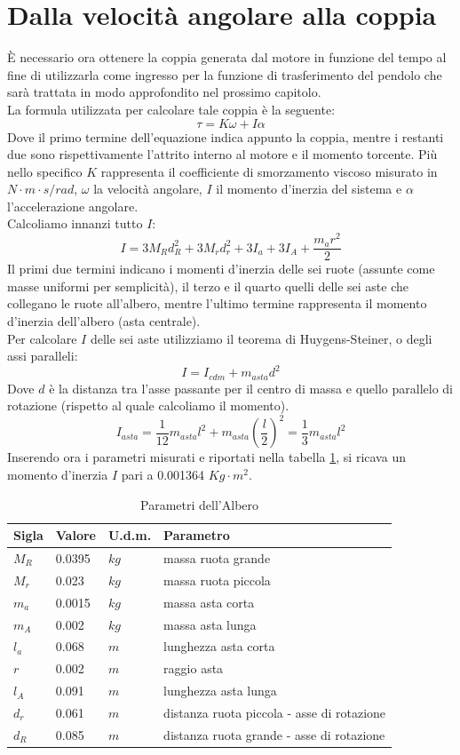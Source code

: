 \section{Dalla velocità angolare alla coppia}
È necessario ora ottenere la coppia generata dal motore in funzione del tempo al fine di utilizzarla come ingresso per la funzione di trasferimento del pendolo che sarà trattata in modo approfondito nel prossimo capitolo.\\
La formula utilizzata per calcolare tale coppia è la seguente:
$$
\tau=K\omega+I\alpha
$$
Dove il primo termine dell'equazione indica appunto la coppia, mentre i restanti due sono rispettivamente l'attrito interno al motore e il momento torcente.
Più nello specifico $K$ rappresenta il coefficiente di smorzamento viscoso misurato in $N\cdot m\cdot s/rad$, $\omega$ la velocità angolare, $I$ il momento d'inerzia del sistema e $\alpha$ l'accelerazione angolare.\\
Calcoliamo innanzi tutto $I$: 
$$
I=3M_Rd_R^2+3M_rd_r^2+3I_a+3I_A+\displaystyle\frac{m_ar^2}{2}
$$
Il primi due termini indicano i momenti d'inerzia delle sei ruote (assunte come masse uniformi per semplicità), il terzo e il quarto quelli delle sei aste che collegano le ruote all'albero, mentre l'ultimo termine rappresenta il momento d'inerzia dell'albero (asta centrale).\\
Per calcolare $I$ delle sei aste utilizziamo il teorema di Huygens-Steiner, o degli assi paralleli:
$$
I=I_{cdm}+m_{asta}d^2
$$
Dove $d$ è la distanza tra l'asse passante per il centro di massa e quello parallelo di rotazione (rispetto al quale calcoliamo il momento).\\
$$
I_{asta}=\displaystyle\frac{1}{12}m_{asta}l^2+m_{asta}(\displaystyle\frac{l}{2})^2=\displaystyle\frac{1}{3}m_{asta}l^2
$$
Inserendo ora i parametri misurati  e riportati nella tabella \ref{Inerzia}, si ricava un momento d'inerzia $I$ pari a 0.001364 $Kg\cdot m^2$.
\begin{table}[ht]
	\begin{tabular}{|l|l|l|l|}
		\hline
		\textbf{Sigla} & \textbf{Valore} & \textbf{U.d.m.} & \textbf{Parametro}\\
		\hline
		$M_R$ & 0.0395 & $kg$ & massa ruota grande\\
		\hline
		$M_r$ & 0.023 & $kg$ & massa ruota piccola\\
		\hline
		$m_a$ & 0.0015 & $kg$ & massa asta corta\\	
		\hline
		$m_A$ & 0.002 & $kg$ & massa asta lunga\\	
		\hline
		$l_a$ & 0.068 & $m$ & lunghezza asta corta\\
		\hline
		$r$ & 0.002 & $m$ & raggio asta\\
		\hline
		$l_A$ & 0.091 & $m$ & lunghezza asta lunga\\
		\hline
		$d_r$ & 0.061 & $m$ & distanza ruota piccola - asse di rotazione\\
		\hline
		$d_R$ & 0.085 & $m$  & distanza ruota grande - asse di rotazione\\
		\hline
	\end{tabular}
\caption{Parametri dell'Albero}
\label{Inerzia}
\end{table}
